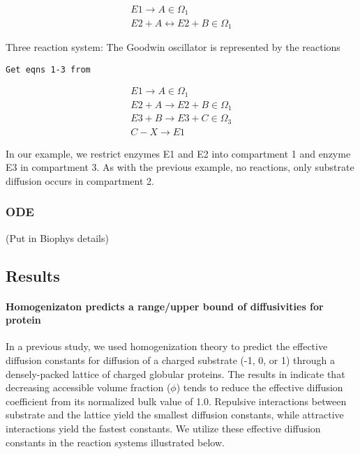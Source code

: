 \begin{align}
E1 \rightarrow A \in \Omega_1 \\
E2+ A \leftrightarrow E2 + B \in \Omega_1
\end{align}

\item  Three reaction system: The Goodwin oscillator is represented by the reactions
\begin{verbatim}
Get eqns 1-3 from
\end{verbatim}

\begin{align}
E1 \rightarrow A \in \Omega_1\\
E2 + A \rightarrow E2 + B \in \Omega_1\\
E3 + B \rightarrow E3 + C \in \Omega_3\\
C -X\rightarrow E1
\end{align}


In our example, we restrict enzymes E1 and E2 into compartment 1 and enzyme E3 in compartment 3. As with the previous example, no reactions, only substrate diffusion occurs in compartment 2.

\lei

\subsubsection{ODE} 
(Put in Biophys details) 



\subsection{Results}

\paragraph*{Homogenizaton predicts a range/upper bound of diffusivities for protein} 
In a previous study, we used homogenization theory to predict the effective diffusion constants for diffusion of a charged substrate (-1, 0, or 1) through a densely-packed lattice of charged globular proteins. The results in  indicate that decreasing accessible volume fraction ($\phi$) tends to reduce the effective diffusion coefficient from its normalized bulk value of 1.0.  Repulsive interactions between substrate and the lattice yield the smallest diffusion constants, while attractive interactions yield the fastest constants. We utilize these effective diffusion constants in the reaction systems illustrated below. 


